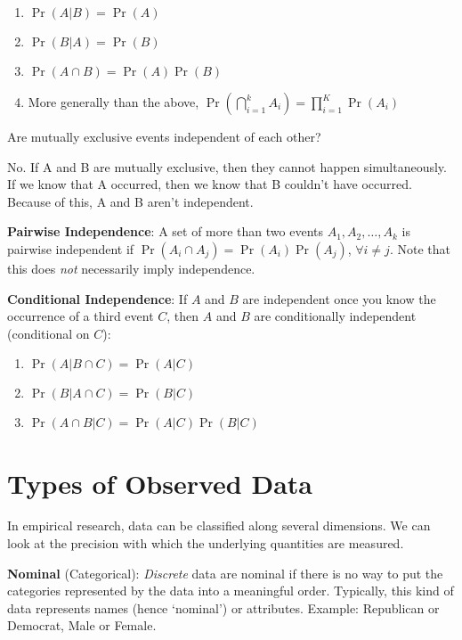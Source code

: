 \documentclass[]{book}
\providecommand{\tightlist}{%
  \setlength{\itemsep}{0pt}\setlength{\parskip}{0pt}}
\theoremstyle{definition}
\theoremstyle{definition}
\theoremstyle{definition}
\theoremstyle{remark}
\begin{document}
\begin{enumerate}
\def\labelenumi{\arabic{enumi}.}
\tightlist
\item
  \(\Pr(A|B)=\Pr(A)\)
\item
  \(\Pr(B|A)=\Pr(B)\)
\item
  \(\Pr(A\cap B)=\Pr(A)\Pr(B)\)
\item
  More generally than the above,
  \(\Pr(\bigcap_{i=1}^k A_i) = \prod_{i = 1}^K \Pr(A_i)\)
\end{enumerate}

Are mutually exclusive events independent of each other?

No. If A and B are mutually exclusive, then they cannot happen
simultaneously. If we know that A occurred, then we know that B couldn't
have occurred. Because of this, A and B aren't independent.

\textbf{Pairwise Independence}: A set of more than two events
\(A_1, A_2, \dots, A_k\) is pairwise independent if
\(\Pr(A_i\cap A_j)=\Pr(A_i)\Pr(A_j)\), \(\forall i\neq j\). Note that
this does \emph{not} necessarily imply independence.

\textbf{Conditional Independence}: If \(A\) and \(B\) are independent
once you know the occurrence of a third event \(C\), then \(A\) and
\(B\) are conditionally independent (conditional on \(C\)):

\begin{enumerate}
\def\labelenumi{\arabic{enumi}.}
\tightlist
\item
  \(\Pr(A|B \cap C)=\Pr(A|C)\)
\item
  \(\Pr(B|A \cap C)=\Pr(B|C)\)
\item
  \(\Pr(A\cap B|C)=\Pr(A|C)\Pr(B|C)\)
\end{enumerate}

\section{Types of Observed Data}\label{types-of-observed-data}

In empirical research, data can be classified along several dimensions.
We can look at the precision with which the underlying quantities are
measured.

\textbf{Nominal} (Categorical): \textit{Discrete} data are nominal if
there is no way to put the categories represented by the data into a
meaningful order. Typically, this kind of data represents names (hence
`nominal') or attributes. Example: Republican or Democrat, Male or
Female.
\end{document}
